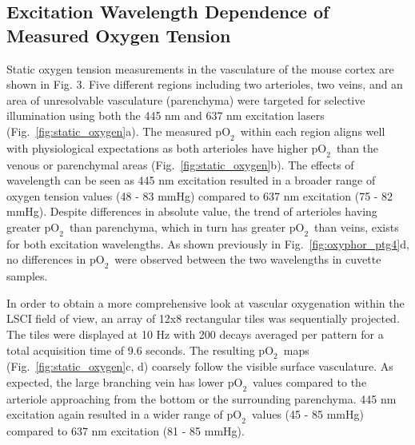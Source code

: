 \documentclass[12pt]{spieman}  %
\newcommand{\pO}{\ensuremath{\text{pO}_2}}
\begin{document}
\begin{spacing}{2}
\subsection{Excitation Wavelength Dependence of Measured Oxygen Tension}
Static oxygen tension measurements in the vasculature of the mouse cortex are shown in Fig. 3. Five different regions including two arterioles, two veins, and an area of unresolvable vasculature (parenchyma) were targeted for selective illumination using both the 445 nm and 637 nm excitation lasers (Fig.~\ref{fig:static_oxygen}a). The measured \pO\ within each region aligns well with physiological expectations as both arterioles have higher \pO\ than the venous or parenchymal areas (Fig.~\ref{fig:static_oxygen}b). The effects of wavelength can be seen as 445 nm excitation resulted in a broader range of oxygen tension values (48 - 83 mmHg) compared to 637 nm excitation (75 - 82 mmHg). Despite differences in absolute value, the trend of arterioles having greater \pO\ than parenchyma, which in turn has greater \pO\ than veins, exists for both excitation wavelengths. As shown previously in Fig.~\ref{fig:oxyphor_ptg4}d, no differences in \pO\ were observed between the two wavelengths in cuvette samples.

In order to obtain a more comprehensive look at vascular oxygenation within the LSCI field of view, an array of 12x8 rectangular tiles was sequentially projected. The tiles were displayed at 10 Hz with 200 decays averaged per pattern for a total acquisition time of 9.6 seconds. The resulting \pO\ maps (Fig.~\ref{fig:static_oxygen}c, d) coarsely follow the visible surface vasculature. As expected, the large branching vein has lower \pO\ values compared to the arteriole approaching from the bottom or the surrounding parenchyma. 445 nm excitation again resulted in a wider range of \pO\ values (45 - 85 mmHg) compared to 637 nm excitation (81 - 85 mmHg).


\end{spacing}
\end{document}
